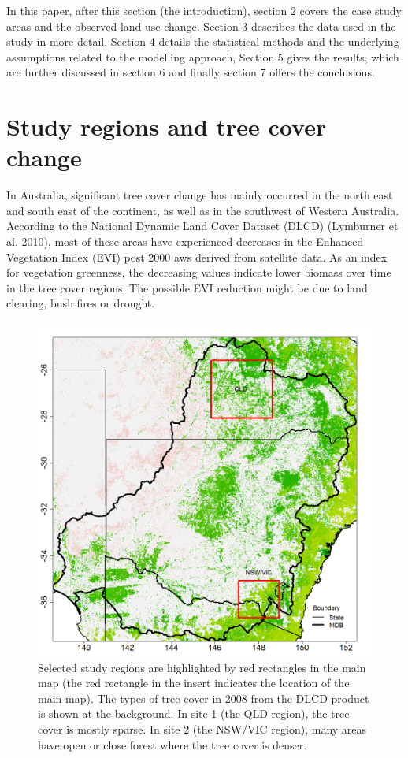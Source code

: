 \documentclass[fleqn,10pt,lineno]{wlpeerj} %
\begin{document}
In this paper, after this section (the introduction), section 2 covers
the case study areas and the observed land use change. Section 3
describes the data used in the study in more detail. Section 4 details
the statistical methods and the underlying assumptions related to the
modelling approach, Section 5 gives the results, which are further
discussed in section 6 and finally section 7 offers the conclusions.

\section{Study regions and tree cover
change}\label{study-regions-and-tree-cover-change}

In Australia, significant tree cover change has mainly occurred in the
north east and south east of the continent, as well as in the southwest
of Western Australia. According to the National Dynamic Land Cover
Dataset (DLCD) (Lymburner et al. 2010), most of these areas have
experienced decreases in the Enhanced Vegetation Index (EVI) post 2000
aws derived from satellite data. As an index for vegetation greenness,
the decreasing values indicate lower biomass over time in the tree cover
regions. The possible EVI reduction might be due to land clearing, bush
fires or drought.

\begin{figure}
\includegraphics[width=0.9\linewidth]{figures/map_selreg} \caption{Selected study regions are highlighted by red rectangles in the main map (the red rectangle in the insert indicates the location of the main map). The types of tree cover in 2008 from the DLCD product is shown at the background. In site 1 (the QLD region), the tree cover is mostly sparse. In site 2 (the NSW/VIC region), many areas have open or close forest where the tree cover is denser.}\label{fig:selreg}
\end{figure}
\end{document}

